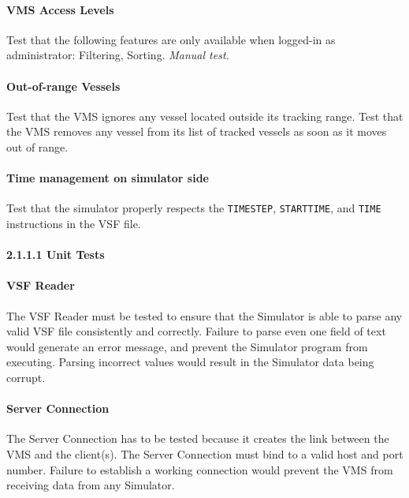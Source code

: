 \documentclass{article}
\begin{document}
\paragraph{VMS Access Levels \\}
Test that the following features are only available when logged-in as administrator: Filtering, Sorting. \emph{Manual test.}

\paragraph{Out-of-range Vessels \\}
Test that the VMS ignores any vessel located outside its tracking range. Test that the VMS removes any vessel from its list of tracked vessels as soon as it moves out of range.

\paragraph{Time management on simulator side \\}
Test that the simulator properly respects the \verb|TIMESTEP|, \verb|STARTTIME|, and \verb|TIME| instructions in the VSF file.

\break
\paragraph{2.1.1.1 Unit Tests}

\paragraph{VSF Reader \\}
The VSF Reader must be tested to ensure that the Simulator is able to parse any valid VSF file consistently and correctly. Failure to parse even one field of text would generate an error message, and prevent the Simulator program from executing. Parsing incorrect values would result in the Simulator data being corrupt.

\paragraph{Server Connection \\}
The Server Connection has to be tested because it creates the link between the VMS and the client(s). The Server Connection must bind to a valid host and port number. Failure to establish a working connection would prevent the VMS from receiving data from any Simulator.
\end{document}
